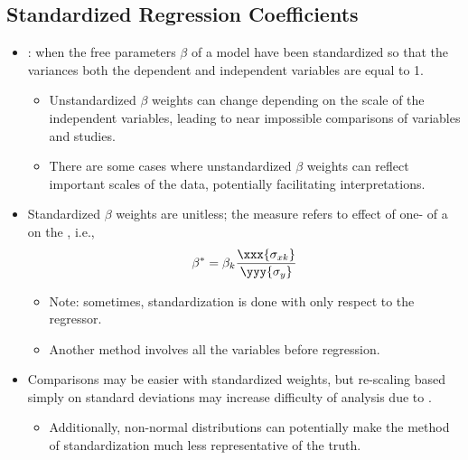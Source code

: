 \begin{itemize}
\begin{itemize}
\begin{itemize}
    \end{itemize}
  \end{itemize}

  \subsection{Standardized Regression Coefficients}
  \begin{itemize}
    \item {}: when the free parameters \(\beta\) of a model have been standardized so that the variances both the dependent and independent variables are equal to 1.
      \begin{itemize}
        \item Unstandardized \(\beta \) weights can change depending on the scale of the independent variables, leading to near impossible comparisons of variables and studies.
        \item There are some cases where unstandardized \(\beta \) weights can reflect important scales of the data, potentially facilitating interpretations.
      \end{itemize}
    \item Standardized \(\beta \) weights are unitless; the measure refers to effect of one-\hyperref[Subsection: Measures of Dispersion]{} of a  on the , i.e.,
    \[%
    \beta^* = \beta_k\frac{\xxx{\sigma_{xk}}}{\yyy{\sigma_y}}
    \]%
    \begin{itemize}
      \item Note: sometimes, standardization is done with only respect to the regressor.
      \item Another method involves \hyperref[Subsection: Z-Score Standardization]{} all the variables before regression.
    \end{itemize}
    \item Comparisons may be easier with standardized weights, but re-scaling based simply on standard deviations may increase difficulty of analysis due to \hyperref[Section: Primer: Partial Correlation]{}.
      \begin{itemize}
        \item Additionally, non-normal distributions can potentially make the method of standardization much less representative of the truth.
      \end{itemize}
  \end{itemize}
  

\end{itemize}
